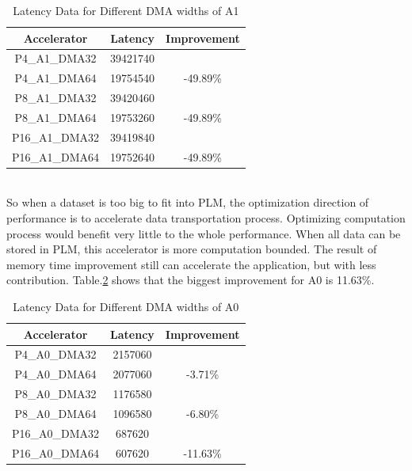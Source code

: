 \documentclass{sig-alternate}
\begin{document}
\begin{table}[ht!]
    \centering
    \begin{tabular}{c|c|c}
    \hline
    Accelerator & Latency & Improvement \\
    \hline
    P4\_A1\_DMA32 &     39421740     & \\
    P4\_A1\_DMA64       &   19754540         & -49.89\% \\
    \hline
    P8\_A1\_DMA32       &   39420460         & \\
    P8\_A1\_DMA64       &   19753260         & -49.89\% \\
    \hline
    P16\_A1\_DMA32 &  39419840       & \\
    P16\_A1\_DMA64 &  19752640       & -49.89\% \\
    \hline
    \end{tabular}
    \caption{Latency Data for Different DMA widths of A1}
    \label{tab-4}
\end{table}
\\
So when a dataset is too big to fit into PLM, the optimization direction of performance is to accelerate data transportation process. Optimizing computation process would benefit very little to the whole performance. When all data can be stored in PLM, this accelerator is more computation bounded. The result of memory time improvement still can accelerate the application, but with less contribution. Table.\ref{tab-5} shows that the biggest improvement for A0 is 11.63\%. 

\begin{table}[ht!]
    \centering
    \begin{tabular}{c|c|c}
    \hline
    Accelerator & Latency & Improvement \\
    \hline
    P4\_A0\_DMA32 & 2157060      & \\
    P4\_A0\_DMA64 &  2077060 &       -3.71\%   \\                                    \hline
    P8\_A0\_DMA32 &  1176580 &       \\                         
    P8\_A0\_DMA64 &  1096580 &       -6.80\%   \\                             
    \hline
    P16\_A0\_DMA32 &  687620 &       \\                                 
    P16\_A0\_DMA64 &  607620 &       -11.63\%   \\ 
    \hline
    \end{tabular}
    \caption{Latency Data for Different DMA widths of A0}
    \label{tab-5}
\end{table}
\end{document}
